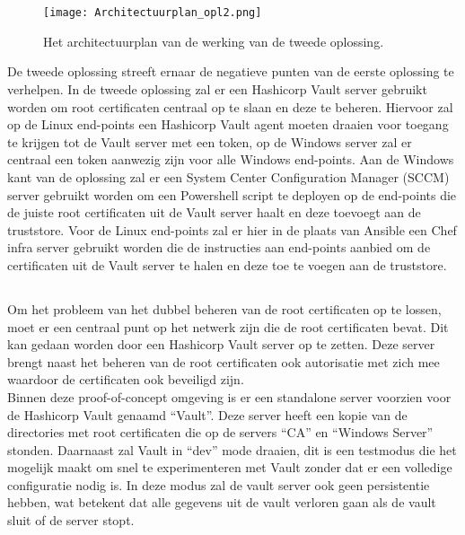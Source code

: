 \pagebreak

\section{}%
\label{sec:Tweede_oplossing}

\begin{figure}
  \centering
  \texttt{[image: Architectuurplan\_opl2.png]}
  \caption[Architectuurplan van de tweede oplossing]{\label{fig:opl2} Het architectuurplan van de werking van de tweede oplossing.}
\end{figure}

De tweede oplossing streeft ernaar de negatieve punten van de eerste oplossing te verhelpen. In de tweede oplossing zal er een Hashicorp Vault server gebruikt worden om root certificaten centraal op te slaan en deze te beheren. 
Hiervoor zal op de Linux end-points een Hashicorp Vault agent moeten draaien voor toegang te krijgen tot de Vault server met een token, op de Windows server zal er centraal een token aanwezig zijn voor alle Windows end-points.
Aan de Windows kant van de oplossing zal er een System Center Configuration Manager (SCCM) server gebruikt worden om een Powershell script te deployen op de end-points die de juiste root certificaten uit de Vault server haalt en deze toevoegt aan de truststore.
Voor de Linux end-points zal er hier in de plaats van Ansible een Chef infra server gebruikt worden die de instructies aan end-points aanbied om de certificaten uit de Vault server te halen en deze toe te voegen aan de truststore.

\subsection{}
\label{subsec:Installeren_van_een_Vault_server}

Om het probleem van het dubbel beheren van de root certificaten op te lossen, moet er een centraal punt op het netwerk zijn die de root certificaten bevat. Dit kan gedaan worden door een Hashicorp Vault server op te zetten. Deze server brengt naast het beheren van de root certificaten ook autorisatie met zich mee waardoor de certificaten ook beveiligd zijn.\\
Binnen deze proof-of-concept omgeving is er een standalone server voorzien voor de Hashicorp Vault genaamd ``Vault''. 
Deze server heeft een kopie van de directories met root certificaten die op de servers ``CA'' en ``Windows Server'' stonden. Daarnaast zal Vault in ``dev'' mode draaien, dit is een testmodus die het mogelijk maakt om snel te experimenteren met Vault zonder dat er een volledige configuratie nodig is. 
In deze modus zal de vault server ook geen persistentie hebben, wat betekent dat alle gegevens uit de vault verloren gaan als de vault sluit of de server stopt.

